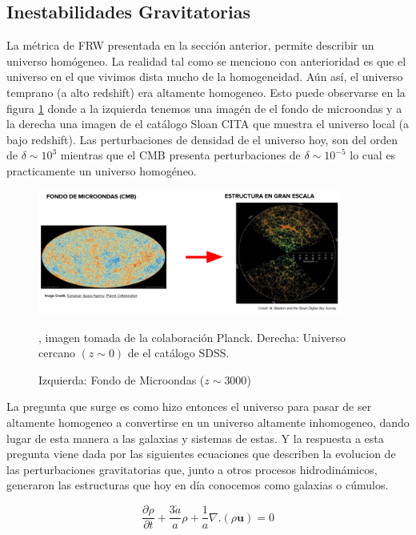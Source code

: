\subsection{Inestabilidades Gravitatorias}

La m\'etrica de FRW presentada en la secci\'on anterior, permite describir un universo hom\'ogeneo. La realidad tal como se menciono con anterioridad es que el universo en el que vivimos dista mucho de la homogeneidad. A\'un as\'i, el universo temprano (a alto redshift) era altamente homogeneo. Esto puede observarse en la figura \ref{CMB} donde a la izquierda tenemos una imag\'en de el fondo de microondas y a la derecha una imagen de el cat\'alogo Sloan CITA que muestra el universo local (a bajo redshift). Las perturbaciones de densidad de el universo hoy, son del orden de  $\delta \sim 10^{3}$ mientras que el CMB presenta perturbaciones de $\delta \sim 10^{-5}$ lo cual es practicamente un universo homog\'eneo.

 

\begin{figure}[h]
\centering
\includegraphics[width=10cm]{Figures/SeminarioII_agustin_rodriguez.png}
\decoRule
\caption[CMB]{Izquierda: Fondo de Microondas ($z\sim 3000$)}, imagen tomada de la colaboraci\'on Planck. Derecha: Universo cercano $(z\sim 0)$ de el cat\'alogo SDSS.
\label{CMB}
\end{figure}

La pregunta que surge es como hizo entonces el universo para pasar de ser altamente homogeneo a convertirse en un universo altamente inhomogeneo, dando lugar de esta manera a las galaxias y sistemas de estas. Y la respuesta a esta pregunta viene dada por las siguientes ecuaciones que describen la evolucion de las perturbaciones gravitatorias que, junto a otros procesos hidrodin\'amicos, generaron las estructuras que hoy en d\'ia conocemos como galaxias o c\'umulos. 

\begin{equation}
    \frac{\partial{\rho}}{\partial{t}}+\frac{3\dot{a}}{a}\rho+\frac{1}{a}\nabla.(\rho\textbf{u})=0
    \label{continuidad}
\end{equation}{}

